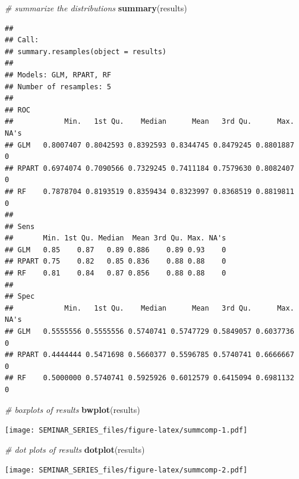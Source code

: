 \documentclass[]{book}
\newenvironment{Shaded}{\begin{snugshade}}{\end{snugshade}}
\newcommand{\KeywordTok}[1]{\textcolor[rgb]{0.13,0.29,0.53}{\textbf{#1}}}
\newcommand{\CommentTok}[1]{\textcolor[rgb]{0.56,0.35,0.01}{\textit{#1}}}
\newcommand{\NormalTok}[1]{#1}
\begin{document}
\begin{Shaded}
\begin{Highlighting}[]
\CommentTok{# summarize the distributions}
\KeywordTok{summary}\NormalTok{(results)}
\end{Highlighting}
\end{Shaded}

\begin{verbatim}
## 
## Call:
## summary.resamples(object = results)
## 
## Models: GLM, RPART, RF 
## Number of resamples: 5 
## 
## ROC 
##            Min.   1st Qu.    Median      Mean   3rd Qu.      Max. NA's
## GLM   0.8007407 0.8042593 0.8392593 0.8344745 0.8479245 0.8801887    0
## RPART 0.6974074 0.7090566 0.7329245 0.7411184 0.7579630 0.8082407    0
## RF    0.7878704 0.8193519 0.8359434 0.8323997 0.8368519 0.8819811    0
## 
## Sens 
##       Min. 1st Qu. Median  Mean 3rd Qu. Max. NA's
## GLM   0.85    0.87   0.89 0.886    0.89 0.93    0
## RPART 0.75    0.82   0.85 0.836    0.88 0.88    0
## RF    0.81    0.84   0.87 0.856    0.88 0.88    0
## 
## Spec 
##            Min.   1st Qu.    Median      Mean   3rd Qu.      Max. NA's
## GLM   0.5555556 0.5555556 0.5740741 0.5747729 0.5849057 0.6037736    0
## RPART 0.4444444 0.5471698 0.5660377 0.5596785 0.5740741 0.6666667    0
## RF    0.5000000 0.5740741 0.5925926 0.6012579 0.6415094 0.6981132    0
\end{verbatim}

\begin{Shaded}
\begin{Highlighting}[]
\CommentTok{# boxplots of results}
\KeywordTok{bwplot}\NormalTok{(results)}
\end{Highlighting}
\end{Shaded}

\texttt{[image: SEMINAR\_SERIES\_files/figure-latex/summcomp-1.pdf]}

\begin{Shaded}
\begin{Highlighting}[]
\CommentTok{# dot plots of results}
\KeywordTok{dotplot}\NormalTok{(results)}
\end{Highlighting}
\end{Shaded}

\texttt{[image: SEMINAR\_SERIES\_files/figure-latex/summcomp-2.pdf]}


\end{document}
